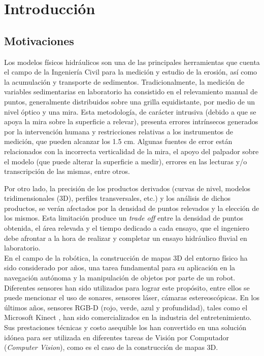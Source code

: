 \chapter{Introducción}

\section{Motivaciones}
\label{S:motivaciones}

Los modelos físicos hidráulicos son una de las principales herramientas que cuenta el campo de la Ingeniería Civil para la medición y estudio de la erosión, así como la acumulación y transporte de sedimentos.
Tradicionalmente, la medición de variables sedimentarias en laboratorio ha consistido en el relevamiento manual de puntos, generalmente distribuidos sobre una grilla equidistante, por medio de un nivel óptico y una mira.
Esta metodología, de carácter intrusiva (debido a que se apoya la mira sobre la superficie a relevar), presenta errores intrínsecos generados por la intervención humana y restricciones relativas a los instrumentos de medición, que pueden alcanzar los 1.5 cm. Algunas fuentes de error están relacionados con la incorrecta verticalidad de la mira, el apoyo del palpador sobre el modelo (que puede alterar la superficie a medir), errores en las lecturas y/o transcripción de las mismas, entre otros.

Por otro lado, la precisión de los productos derivados (curvas de nivel\cite{wiki-curva-de-nivel}, modelos tridimensionales (3D), perfiles transversales, etc.) y los análisis de dichos productos, se verán afectados por la densidad de puntos relevados y la elección de los mismos.
Esta limitación produce un \textit{trade off} entre la densidad de puntos obtenida, el área relevada y el tiempo dedicado a cada ensayo, que el ingeniero debe afrontar a la hora de realizar y completar un ensayo hidráulico fluvial en laboratorio. \\

En el campo de la robótica, la construcción de mapas 3D del entorno físico ha sido considerado por años, una tarea fundamental para su aplicación en la navegación autónoma y la manipulación de objetos por parte de un robot. Diferentes sensores han sido utilizados para lograr este propósito, entre ellos se puede mencionar el uso de sonares\cite{varveropoulos2005robot}, sensores láser\cite{chou2013robotic}, cámaras estereoscópicas\cite{Konolige08}.
En los últimos años, sensores RGB-D (rojo, verde, azul y profundidad), tales como el Microsoft Kinect \cite{microsoft-kinect}, han sido comercializados en la industria del entretenimiento. Sus prestaciones técnicas y costo asequible los han convertido en una solución idónea para ser utilizada en diferentes tareas de Visión por Computador (\textit{Computer Vision}), como es el caso de la construcción de mapas 3D\cite{henry2010rgb}\cite{engelhardreal}. \\

